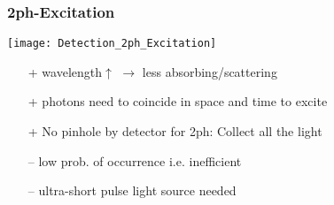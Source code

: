 \subsubsection{2ph-Excitation}
%
\begin{minipage}{.3\columnwidth}
    \texttt{[image: Detection\_2ph\_Excitation]}
\end{minipage}%
\begin{minipage}{.7\columnwidth}
    \begin{itemize}
        \item[+] wavelength$\uparrow$ $\to$ less absorbing/scattering
        \item[+] photons need to coincide in space and time to excite
        \item[+] No pinhole by detector for 2ph: Collect all the light
        \item[--] low prob. of occurrence i.e. inefficient
        \item[--] ultra-short pulse light source needed
    \end{itemize}
\end{minipage}
